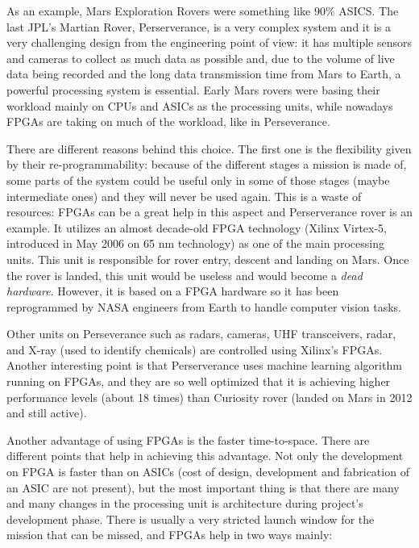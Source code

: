 As an example, Mars Exploration Rovers were something like 90\% ASICS. The last JPL's Martian Rover, Perserverance, is a very complex system and it is a very challenging design from the engineering point of view: it has multiple sensors and cameras to collect as much data as possible and, due to the volume of live data being recorded and the long data transmission time from Mars to Earth, a powerful processing system is essential. Early Mars rovers were basing their workload mainly on CPUs and ASICs as the processing units, while nowadays FPGAs are taking on much of the workload, like in Perseverance.\bigskip

There are different reasons behind this choice. The first one is the flexibility given by their re-programmability: because of the different stages a mission is made of, some parts of the system could be useful only in some of those stages (maybe intermediate ones) and they will never be used again. This is a waste of resources: FPGAs can be a great help in this aspect and Perserverance rover is an example. It utilizes an almost decade-old FPGA technology (Xilinx Virtex-5, introduced in May 2006 on 65 nm technology) as one of the main processing units. This unit is responsible for rover entry, descent and landing on Mars. Once the rover is landed, this unit would be useless and would become a \textit{dead hardware}. However, it is based on a FPGA hardware so it has been reprogrammed by NASA engineers from Earth to handle computer vision tasks.\bigskip

Other units on Perseverance such as radars, cameras, UHF transceivers, radar, and X-ray (used to identify chemicals) are controlled using Xilinx's FPGAs. Another interesting point is that Perserverance uses machine learning algorithm running on FPGAs, and they are so well optimized that it is achieving higher performance levels (about 18 times) than Curiosity rover (landed on Mars in 2012 and still active). \bigskip

Another advantage of using FPGAs is the faster time-to-space. There are different points that help in achieving this advantage. Not only the development on FPGA is faster than on ASICs (cost of design, development and fabrication of an ASIC are not present), but the most important thing is that there are many and many changes in the processing unit is architecture during project's development phase. There is usually a very stricted launch window for the mission that can be missed, and FPGAs help in two ways mainly:

